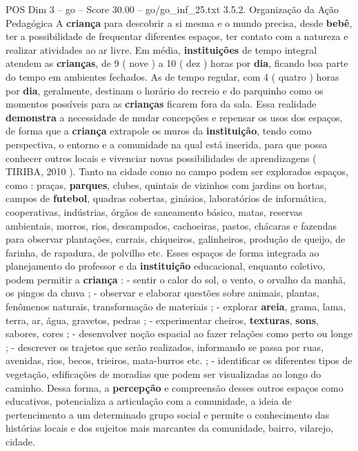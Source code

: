\begin{textsample}{POS Dim 3 – go – Score 30.00 – go/go\_inf\_25.txt}  \label{ex:f3_pos_050}
3.5.2.
Organização da Ação Pedagógica A \textbf{criança} para descobrir a si mesma e o mundo precisa, desde \textbf{bebê}, ter a possibilidade de frequentar diferentes espaços, ter contato com a natureza e realizar atividades ao ar livre.
Em média, \textbf{instituições} de tempo integral atendem as \textbf{crianças}, de 9 ( nove ) a 10 ( dez ) horas por \textbf{dia}, ficando boa parte do tempo em ambientes fechados.
As de tempo regular, com 4 ( quatro ) horas por \textbf{dia}, geralmente, destinam o horário do recreio e do parquinho como os momentos possíveis para as \textbf{crianças} ficarem fora da sala.
Essa realidade \textbf{demonstra} a necessidade de mudar concepções e repensar os usos dos espaços, de forma que a \textbf{criança} extrapole os muros da \textbf{instituição}, tendo como perspectiva, o entorno e a comunidade na qual está inserida, para que possa conhecer outros locais e vivenciar novas possibilidades de aprendizagens ( TIRIBA, 2010 ).
Tanto na cidade como no campo podem ser explorados espaços, como : praças, \textbf{parques}, clubes, quintais de vizinhos com jardins ou hortas, campos de \textbf{futebol}, quadras cobertas, ginásios, laboratórios de informática, cooperativas, indústrias, órgãos de saneamento básico, matas, reservas ambientais, morros, rios, descampados, cachoeiras, pastos, chácaras e fazendas para observar plantações, currais, chiqueiros, galinheiros, produção de queijo, de farinha, de rapadura, de polvilho etc.
Esses espaços de forma integrada ao planejamento do professor e da \textbf{instituição} educacional, enquanto coletivo, podem permitir a \textbf{criança} : - sentir o calor do sol, o vento, o orvalho da manhã, os pingos da chuva ; - observar e elaborar questões sobre animais, plantas, fenômenos naturais, transformação de materiais ; - explorar \textbf{areia}, grama, lama, terra, ar, água, gravetos, pedras ; - experimentar cheiros, \textbf{texturas}, \textbf{sons}, sabores, cores ; - desenvolver noção espacial ao fazer relações como perto ou longe ; - descrever os trajetos que serão realizados, informando se passa por ruas, avenidas, rios, becos, trieiros, mata-burros etc. ; - identificar os diferentes tipos de vegetação, edificações de moradias que podem ser visualizadas ao longo do caminho.
Dessa forma, a \textbf{percepção} e compreensão desses outros espaços como educativos, potencializa a articulação com a comunidade, a ideia de pertencimento a um determinado grupo social e permite o conhecimento das histórias locais e dos sujeitos mais marcantes da comunidade, bairro, vilarejo, cidade.

\end{textsample}
